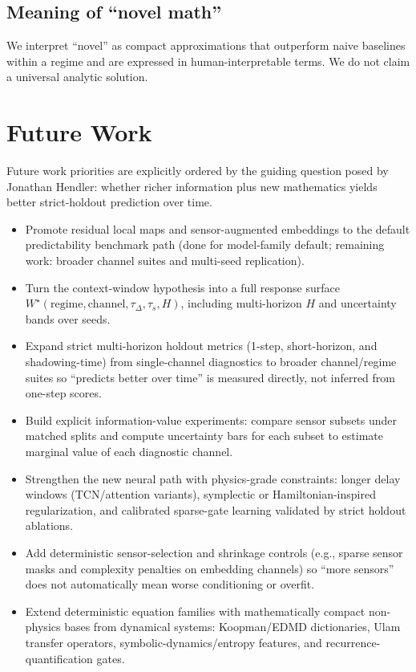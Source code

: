 \documentclass[11pt]{article}
\begin{document}
\subsection*{Meaning of ``novel math''}
We interpret ``novel'' as compact approximations that outperform naive baselines within a regime and are expressed in human-interpretable terms. We do not claim a universal analytic solution.

\section{Future Work}
Future work priorities are explicitly ordered by the guiding question posed by Jonathan Hendler: whether richer information plus new mathematics yields better strict-holdout prediction over time.
\begin{itemize}
\item Promote residual local maps and sensor-augmented embeddings to the default predictability benchmark path (done for model-family default; remaining work: broader channel suites and multi-seed replication).
\item Turn the context-window hypothesis into a full response surface $W^\star(\text{regime}, \text{channel}, \tau_\Delta, \tau_s, H)$, including multi-horizon $H$ and uncertainty bands over seeds.
\item Expand strict multi-horizon holdout metrics (1-step, short-horizon, and shadowing-time) from single-channel diagnostics to broader channel/regime suites so ``predicts better over time'' is measured directly, not inferred from one-step scores.
\item Build explicit information-value experiments: compare sensor subsets under matched splits and compute uncertainty bars for each subset to estimate marginal value of each diagnostic channel.
\item Strengthen the new neural path with physics-grade constraints: longer delay windows (TCN/attention variants), symplectic or Hamiltonian-inspired regularization, and calibrated sparse-gate learning validated by strict holdout ablations.
\item Add deterministic sensor-selection and shrinkage controls (e.g., sparse sensor masks and complexity penalties on embedding channels) so ``more sensors'' does not automatically mean worse conditioning or overfit.
\item Extend deterministic equation families with mathematically compact non-physics bases from dynamical systems: Koopman/EDMD dictionaries\cite{Williams2015}, Ulam transfer operators, symbolic-dynamics/entropy features, and recurrence-quantification gates.

\end{itemize}
\end{document}
